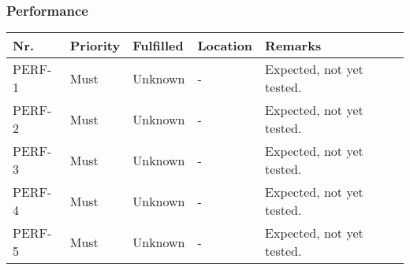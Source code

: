 	\subsubsection{Performance}
	\begin{table}[H]
	\begin{tabular}{llllL{0.5\textwidth}}
	
	Nr.    & Priority & Fulfilled & Location & Remarks \\ \hline
	
	PERF-1 & Must     & Unknown  & -         & Expected, not yet tested. \\
	
	PERF-2 & Must     & Unknown  & -         & Expected, not yet tested. \\
	
	PERF-3 & Must     & Unknown  & -         & Expected, not yet tested. \\
	
	PERF-4 & Must     & Unknown  & -         & Expected, not yet tested. \\
	
	PERF-5 & Must     & Unknown  & -         & Expected, not yet tested. \\
						
	\end{tabular}
\end{table}

